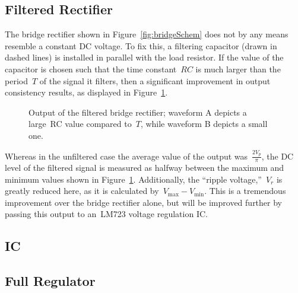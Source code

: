 \subsection{Filtered Rectifier}
The bridge rectifier shown in Figure~\ref{fig:bridgeSchem} does not by any
means resemble a constant DC voltage.  To fix this, a filtering capacitor
(drawn in dashed lines) is installed in parallel with the load resistor.  If
the value of the capacitor is chosen such that the time constant~$RC$ is much
larger than the period~$T$ of the signal it filters, then a significant
improvement in output consistency results, as displayed in
Figure~\ref{fig:bridgeRectOutFilt}.
%
\begin{figure}[H]
	\centering
	
	\parbox{.6\textwidth}{
	\caption{Output of the filtered bridge rectifier; waveform A depicts a
	large~RC value compared to~$T$, while waveform B depicts a small one.}
	\label{fig:bridgeRectOutFilt}
	}
\end{figure}
%
Whereas in the unfiltered case the average value of the output was~$\frac{2
V_p}{\pi}$, the DC level of the filtered signal is measured as halfway between
the maximum and minimum values shown in Figure~\ref{fig:bridgeRectOutFilt}.
Additionally, the ``ripple voltage,''~$V_r$ is greatly reduced here, as it is
calculated by~$V_\text{max} - V_\text{min}$.  This is a tremendous improvement
over the bridge rectifier alone, but will be improved further by passing this
output to an~LM723 voltage regulation IC.



\subsection{IC}
\begin{figure}[H]
	\centering
	
\end{figure}

\subsection{Full Regulator}
\begin{figure}[H]
	\centering
	
\end{figure}
